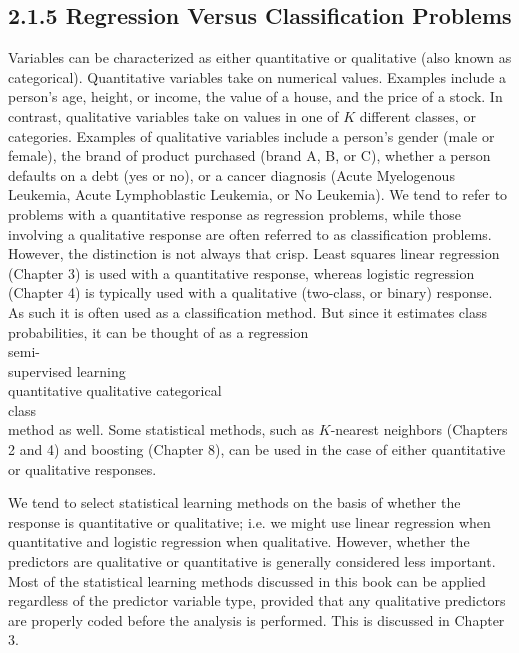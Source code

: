 \documentclass[10pt]{article}
\begin{document}
\subsection*{2.1.5 Regression Versus Classification Problems}
Variables can be characterized as either quantitative or qualitative (also known as categorical). Quantitative variables take on numerical values. Examples include a person's age, height, or income, the value of a house, and the price of a stock. In contrast, qualitative variables take on values in one of $K$ different classes, or categories. Examples of qualitative variables include a person's gender (male or female), the brand of product purchased (brand A, B, or C), whether a person defaults on a debt (yes or no), or a cancer diagnosis (Acute Myelogenous Leukemia, Acute Lymphoblastic Leukemia, or No Leukemia). We tend to refer to problems with a quantitative response as regression problems, while those involving a qualitative response are often referred to as classification problems. However, the distinction is not always that crisp. Least squares linear regression (Chapter 3) is used with a quantitative response, whereas logistic regression (Chapter 4) is typically used with a qualitative (two-class, or binary) response. As such it is often used as a classification method. But since it estimates class probabilities, it can be thought of as a regression\\
semi-\\
supervised learning\\
quantitative qualitative categorical\\
class\\
method as well. Some statistical methods, such as $K$-nearest neighbors (Chapters 2 and 4) and boosting (Chapter 8), can be used in the case of either quantitative or qualitative responses.

We tend to select statistical learning methods on the basis of whether the response is quantitative or qualitative; i.e. we might use linear regression when quantitative and logistic regression when qualitative. However, whether the predictors are qualitative or quantitative is generally considered less important. Most of the statistical learning methods discussed in this book can be applied regardless of the predictor variable type, provided that any qualitative predictors are properly coded before the analysis is performed. This is discussed in Chapter 3.
\end{document}
